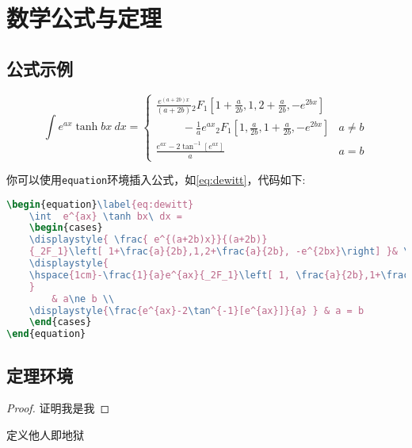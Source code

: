 \chapter{数学公式与定理}

\section{公式示例}
\begin{equation}\label{eq:dewitt}
    \int  e^{ax} \tanh bx\ dx = 
    \begin{cases}
    \displaystyle{ \frac{ e^{(a+2b)x}}{(a+2b)} 
    {_2F_1}\left[ 1+\frac{a}{2b},1,2+\frac{a}{2b}, -e^{2bx}\right] }& \\
    \displaystyle{
    \hspace{1cm}-\frac{1}{a}e^{ax}{_2F_1}\left[ 1, \frac{a}{2b},1+\frac{a}{2b}, -e^{2bx}\right]
    }
     & a\ne b \\
    \displaystyle{\frac{e^{ax}-2\tan^{-1}[e^{ax}]}{a} } & a = b
    \end{cases}
\end{equation}
    
你可以使用\lstinline|equation|环境插入公式，如\cref{eq:dewitt}，代码如下:
\begin{lstlisting}[language=TeX]
\begin{equation}\label{eq:dewitt}
    \int  e^{ax} \tanh bx\ dx = 
    \begin{cases}
    \displaystyle{ \frac{ e^{(a+2b)x}}{(a+2b)} 
    {_2F_1}\left[ 1+\frac{a}{2b},1,2+\frac{a}{2b}, -e^{2bx}\right] }& \\
    \displaystyle{
    \hspace{1cm}-\frac{1}{a}e^{ax}{_2F_1}\left[ 1, \frac{a}{2b},1+\frac{a}{2b}, -e^{2bx}\right]
    }
        & a\ne b \\
    \displaystyle{\frac{e^{ax}-2\tan^{-1}[e^{ax}]}{a} } & a = b
    \end{cases}
\end{equation}
\end{lstlisting}

\section{定理环境}

\begin{proof}
    证明我是我
\end{proof}

\begin{definition}[他人]
    定义他人即地狱
\end{definition}


